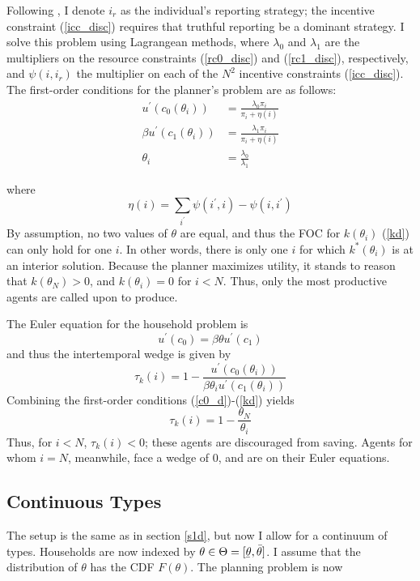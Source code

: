 \documentclass[11pt]{article}
\newcommand{\ubar}[1]{\underaccent{\bar}{#1}}
\newcommand{\p}{\prime}
\begin{document}
Following \cite{golosov2006new}, I denote \( i_r \) as the individual's reporting strategy; the incentive constraint (\ref{icc_disc}) requires that truthful reporting be a dominant strategy. I solve this problem using Lagrangean methods, where \( \lambda_0 \) and \( \lambda_1 \) are the multipliers on the resource constraints (\ref{rc0_disc}) and (\ref{rc1_disc}), respectively, and \( \psi(i, i_r) \) the multiplier on each of the \( N^2 \) incentive constraints (\ref{icc_disc}). The first-order conditions for the planner's problem are as follows:
\begin{align}
    u^\p(c_0(\theta_i)) &= \frac{\lambda_0 \pi_i}{\pi_i + \eta(i)} \label{c0_d} \\
    \beta u^\p (c_1(\theta_i)) &= \frac{\lambda_1 \pi_i}{\pi_i + \eta(i)} \label{c1_d} \\
    \theta_i &= \frac{\lambda_0}{\lambda_1} \label{kd}
\end{align}

where
\[ \eta(i) = \sum_{i^\p} \psi(i^\p, i) - \psi(i, i^\p) \]
By assumption, no two values of \( \theta \) are equal, and thus the FOC for \( k(\theta_i) \) (\ref{kd}) can only hold for one \( i \). In other words, there is only one \( i \) for which \( k^*(\theta_i) \) is at an interior solution. Because the planner maximizes utility, it stands to reason that \( k(\theta_N) > 0 \), and \( k(\theta_i) = 0 \) for \( i < N \). Thus, only the most productive agents are called upon to produce. 

The Euler equation for the household problem is 
\[u^\p(c_0) = \beta \theta u^\p(c_1)\]
and thus the intertemporal wedge is given by 
\[\tau_k(i) = 1 - \frac{u^\p(c_0(\theta_i))}{\beta \theta_i u^\p(c_1(\theta_i))}\]
Combining the first-order conditions (\ref{c0_d})-(\ref{kd}) yields 
\[\tau_k(i) = 1 - \frac{\theta_N}{\theta_i}\]
Thus, for \( i < N \), \( \tau_k(i) < 0 \); these agents are discouraged from saving. Agents for whom \( i = N \), meanwhile, face a wedge of 0, and are on their Euler equations. 

\subsection{Continuous Types} \label{s1c}

The setup is the same as in section \ref{s1d}, but now I allow for a continuum of types. Households are now indexed by \( \theta\in\Theta = [\ubar{\theta}, \bar{\theta}] \). I assume that the distribution of \( \theta \) has the CDF \( F(\theta) \). The planning problem is now
\end{document}
